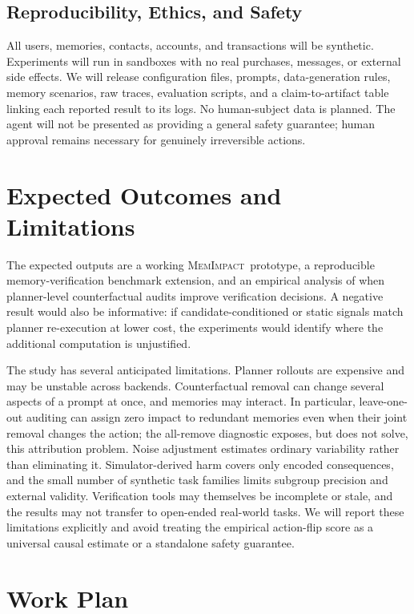 \documentclass[11pt]{article}
\newcommand{\method}{\textsc{MemImpact}}
\begin{document}
\subsection{Reproducibility, Ethics, and Safety}

All users, memories, contacts, accounts, and transactions will be synthetic. Experiments will run in sandboxes with no real purchases, messages, or external side effects. We will release configuration files, prompts, data-generation rules, memory scenarios, raw traces, evaluation scripts, and a claim-to-artifact table linking each reported result to its logs. No human-subject data is planned. The agent will not be presented as providing a general safety guarantee; human approval remains necessary for genuinely irreversible actions.

\section{Expected Outcomes and Limitations}

The expected outputs are a working \method\ prototype, a reproducible memory-verification benchmark extension, and an empirical analysis of when planner-level counterfactual audits improve verification decisions. A negative result would also be informative: if candidate-conditioned or static signals match planner re-execution at lower cost, the experiments would identify where the additional computation is unjustified.

The study has several anticipated limitations. Planner rollouts are expensive and may be unstable across backends. Counterfactual removal can change several aspects of a prompt at once, and memories may interact. In particular, leave-one-out auditing can assign zero impact to redundant memories even when their joint removal changes the action; the all-remove diagnostic exposes, but does not solve, this attribution problem. Noise adjustment estimates ordinary variability rather than eliminating it. Simulator-derived harm covers only encoded consequences, and the small number of synthetic task families limits subgroup precision and external validity. Verification tools may themselves be incomplete or stale, and the results may not transfer to open-ended real-world tasks. We will report these limitations explicitly and avoid treating the empirical action-flip score as a universal causal estimate or a standalone safety guarantee.

\section{Work Plan}
\end{document}
